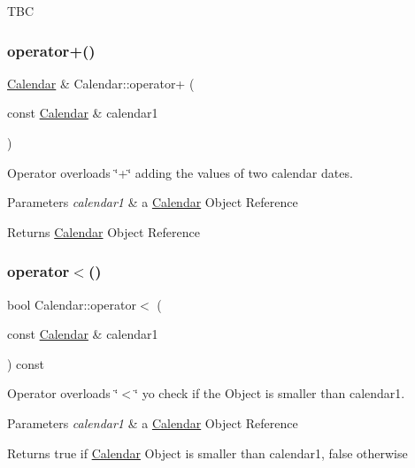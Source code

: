 T\+BC \mbox{\label{class_calendar_aebeae7e3eb616dc294ae6f026f5776bf}} 
\subsubsection{\texorpdfstring{operator+()}{operator+()}}
{\footnotesize\ttfamily \hyperlink{class_calendar}{Calendar} \& Calendar\+::operator+ (\begin{DoxyParamCaption}\item[{const \hyperlink{class_calendar}{Calendar} \&}]{calendar1 }\end{DoxyParamCaption})}



Operator overloads \char`\"{}+\char`\"{} adding the values of two calendar dates. 


\begin{DoxyParams}{Parameters}
{\em calendar1} & a \hyperlink{class_calendar}{Calendar} Object Reference \\
\hline
\end{DoxyParams}
\begin{DoxyReturn}{Returns}
\hyperlink{class_calendar}{Calendar} Object Reference 
\end{DoxyReturn}
\mbox{\label{class_calendar_ab701051dc424c48d6f423cdf0bca6ad4}} 
\subsubsection{\texorpdfstring{operator$<$()}{operator<()}}
{\footnotesize\ttfamily bool Calendar\+::operator$<$ (\begin{DoxyParamCaption}\item[{const \hyperlink{class_calendar}{Calendar} \&}]{calendar1 }\end{DoxyParamCaption}) const}



Operator overloads \char`\"{}$<$\char`\"{} yo check if the Object is smaller than calendar1. 


\begin{DoxyParams}{Parameters}
{\em calendar1} & a \hyperlink{class_calendar}{Calendar} Object Reference \\
\hline
\end{DoxyParams}
\begin{DoxyReturn}{Returns}
true if \hyperlink{class_calendar}{Calendar} Object is smaller than calendar1, false otherwise 
\end{DoxyReturn}
\mbox{\label{class_calendar_a25fdea266ecbfdf5e5dc0bde770b51c0}} 
